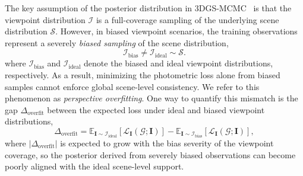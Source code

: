 \documentclass[lettersize,journal]{IEEEtran}
\begin{document}
The key assumption of the posterior distribution in 3DGS-MCMC~\cite{mcmc} is that the viewpoint distribution $\mathcal{I}$ is a full-coverage sampling of the underlying scene distribution $\mathcal{S}$. However, in biased viewpoint scenarios, the training observations represent a severely \emph{biased sampling} of the scene distribution,
\begin{equation}
    \mathcal{I}_{\text{bias}} \neq \mathcal{I}_{\text{ideal}} \sim \mathcal{S}.
    \label{eq5}
\end{equation}
where $\mathcal{I}_{\text{bias}}$ and $\mathcal{I}_{\text{ideal}}$ denote the biased and ideal viewpoint distributions, respectively.
As a result, minimizing the photometric loss alone from biased samples cannot enforce global scene-level consistency. We refer to this phenomenon as \emph{perspective overfitting}. One way to quantify this mismatch is the gap $\Delta_{\text{overfit}}$ between the expected loss under ideal and biased viewpoint distributions,
\begin{equation}
    \Delta_{\text{overfit}} = \mathbb{E}_{\mathbf{I} \sim \mathcal{I}_{\text{ideal}}} \left[ \mathcal{L}_{\mathbf{I}} (\mathcal{G}; \mathbf{I}) \right] - \mathbb{E}_{\mathbf{I} \sim \mathcal{I}_{\text{bias}}} \left[ \mathcal{L}_{\mathbf{I}} (\mathcal{G}; \mathbf{I}) \right],
    \label{eq5.1}
\end{equation}
where $\vert \Delta_{\text{overfit}} \vert$ is expected to grow with the bias severity of the viewpoint coverage, so the posterior derived from severely biased observations can become poorly aligned with the ideal scene-level support.
\end{document}
